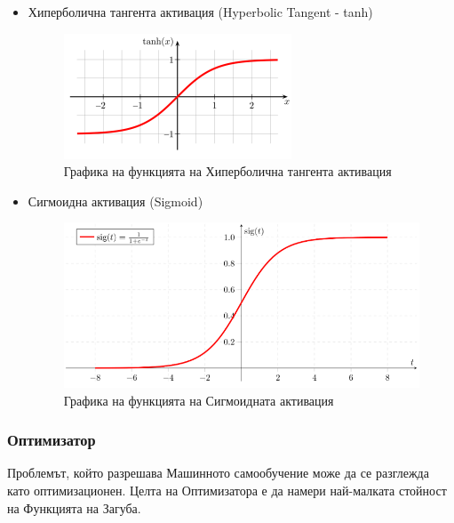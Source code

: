 \documentclass{article}
\begin{document}
\begin{itemize}
        \item Хиперболична тангента активация (Hyperbolic Tangent - tanh)

        \begin{figure}[H]
            \centering
            \captionsetup{justification=centering}
            \includegraphics[width=256px, keepaspectratio]{chapter-03/tanh.png}
            \caption{Графика на функцията на Хиперболична тангента активация}
        \end{figure}

        \item Сигмоидна активация (Sigmoid)

        \begin{figure}[H]
            \centering
            \captionsetup{justification=centering}
            \includegraphics{chapter-03/sigmoid.png}
            \caption{Графика на функцията на Сигмоидната активация}
        \end{figure}

    \end{itemize}

    \subsubsection{Оптимизатор}

    Проблемът, който разрешава Машинното самообучение може да се разглежда като оптимизационен. Целта на Оптимизатора е да
    намери най-малката стойност на Функцията на Загуба. \cite{deep-learning-practitioner}
\end{document}
